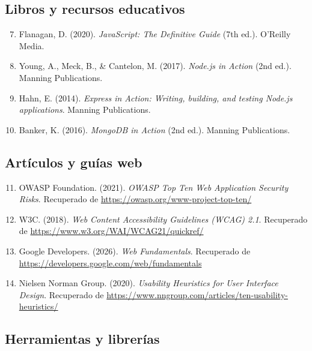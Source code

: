\documentclass[12pt,a4paper]{article}
\begin{document}
\subsection{Libros y recursos educativos}

\begin{enumerate}
    \setcounter{enumi}{6}
    
    \item Flanagan, D. (2020). \textit{JavaScript: The Definitive Guide} (7th ed.). O'Reilly Media.
    
    \item Young, A., Meck, B., \& Cantelon, M. (2017). \textit{Node.js in Action} (2nd ed.). Manning Publications.
    
    \item Hahn, E. (2014). \textit{Express in Action: Writing, building, and testing Node.js applications}. Manning Publications.
    
    \item Banker, K. (2016). \textit{MongoDB in Action} (2nd ed.). Manning Publications.
\end{enumerate}

\subsection{Artículos y guías web}

\begin{enumerate}
    \setcounter{enumi}{10}
    
    \item OWASP Foundation. (2021). \textit{OWASP Top Ten Web Application Security Risks}. Recuperado de \url{https://owasp.org/www-project-top-ten/}
    
    \item W3C. (2018). \textit{Web Content Accessibility Guidelines (WCAG) 2.1}. Recuperado de \url{https://www.w3.org/WAI/WCAG21/quickref/}
    
    \item Google Developers. (2026). \textit{Web Fundamentals}. Recuperado de \url{https://developers.google.com/web/fundamentals}
    
    \item Nielsen Norman Group. (2020). \textit{Usability Heuristics for User Interface Design}. Recuperado de \url{https://www.nngroup.com/articles/ten-usability-heuristics/}
\end{enumerate}

\subsection{Herramientas y librerías}
\end{document}
